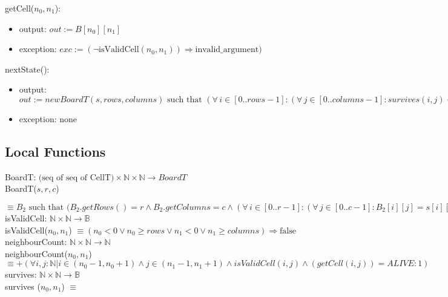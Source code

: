 \documentclass[12pt]{article}
\begin{document}
\noindent getCell($n_0,n_1$):
\begin{itemize}
\item output: $out := B[n_0][n_1]$
\item exception: $exc := (\lnot \text{isValidCell}(n_0,n_1) ) \Rightarrow \text{invalid\_argument})$

\end{itemize}

\noindent nextState():
\begin{itemize}
\item output: $out := new BoardT(s, rows, columns) \text{ such that } (\forall\, i \in [0..rows-1] : (\forall\, j \in [0..columns-1] : survives(i,j) \Rightarrow s[i][j] = ALIVE \wedge  \neg survives(i,j) \Rightarrow s[i][j] = DEAD) ) $
\item exception: none
\end{itemize}



\subsection*{Local Functions}

\noindent BoardT: $ \text{(seq of seq of CellT)} \times \mathbb{N} \times \mathbb{N} \rightarrow BoardT$\\
\noindent BoardT($\mathit{s,r,c}$)
 
$ \equiv B_2 \text{ such that }  (B_2.getRows() = r \wedge B_2.getColumns = c \wedge  (\forall\, i \in [0..r - 1] : (\forall\, j \in [0..c - 1] : B_2[i][j] = s[i][j]) )
$\\


\noindent isValidCell: $\mathbb{N}  \times \mathbb{N} \rightarrow \mathbb{B} $ \\ 
\noindent isValidCell($n_0,n_1$)  $ \equiv (n_0 < 0 \lor n_0 \ge rows \lor n_1 < 0 \lor n_1 \ge columns) \Rightarrow \text{false}$ \\ 


  
\noindent neighbourCount: $\mathbb{N}  \times \mathbb{N} \rightarrow \mathbb{N}$ \\ 
\noindent neighbourCount($ n_0, n_1$) $\equiv +(\forall i,j: \mathbb{N} | i \in (n_0-1, n_0+1) \wedge
 j\in (n_1-1, n_1+1) \wedge isValidCell(i,j) \wedge (getCell(i,j)) = ALIVE : 1)$ \\


  

 \noindent survives:  $\mathbb{N}  \times \mathbb{N} \rightarrow \mathbb{B}$ \\ 
\noindent survives ($n_0, n_1$) $\equiv$\\
\end{document}
